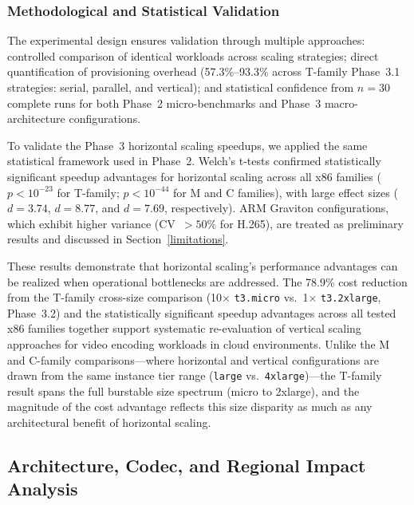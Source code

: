 \documentclass[conference]{IEEEtran}
\begin{document}
\subsubsection{Methodological and Statistical Validation}

The experimental design ensures validation through multiple approaches:
controlled comparison of identical workloads across scaling strategies; direct
quantification of provisioning overhead (57.3\%--93.3\% across T-family Phase~3.1 strategies: serial, parallel, and vertical); and statistical confidence from $n=30$ complete runs
for both Phase~2 micro-benchmarks and Phase~3 macro-architecture configurations.

To validate the Phase~3 horizontal scaling speedups, we applied the same
statistical framework used in Phase~2. Welch's t-tests confirmed statistically
significant speedup advantages for horizontal scaling across all x86 families
($p < 10^{-23}$ for T-family; $p < 10^{-44}$ for M and C families), with large
effect sizes ($d = 3.74$, $d = 8.77$, and $d = 7.69$, respectively). ARM
Graviton configurations, which exhibit higher variance (CV~$>50\%$ for H.265),
are treated as preliminary results and discussed in Section~\ref{limitations}.

These results demonstrate that horizontal scaling's performance advantages can
be realized when operational bottlenecks are addressed. The 78.9\% cost
reduction from the T-family cross-size comparison (10$\times$ \texttt{t3.micro}
vs.\ 1$\times$ \texttt{t3.2xlarge}, Phase~3.2) and the statistically
significant speedup advantages across all tested x86 families together support
systematic re-evaluation of vertical scaling approaches for video encoding
workloads in cloud environments. Unlike the M and C-family comparisons---where
horizontal and vertical configurations are drawn from the same instance tier
range (\texttt{large} vs.\ \texttt{4xlarge})---the T-family result spans the
full burstable size spectrum (micro to 2xlarge), and the magnitude of the cost
advantage reflects this size disparity as much as any architectural benefit of
horizontal scaling.

\subsection{Architecture, Codec, and Regional Impact Analysis}
\end{document}
